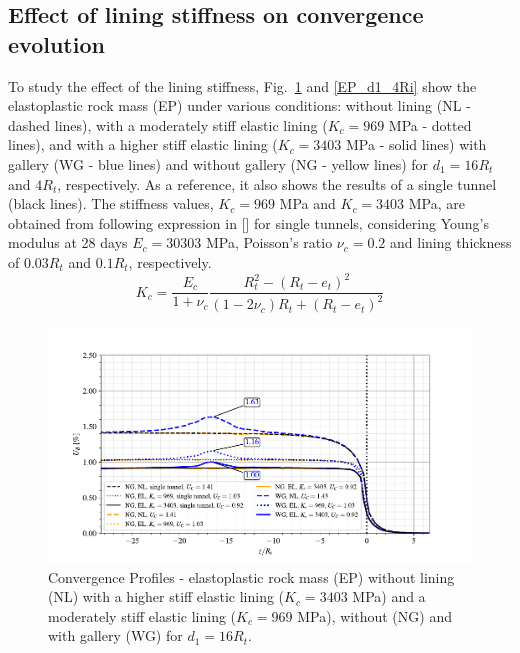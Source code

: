 \documentclass[a4paper,fleqn]{cas-sc}
\begin{document}
\subsection{Effect of lining stiffness on convergence evolution}\label{}

To study the effect of the lining stiffness, Fig.~\ref{EP_d1_16Ri} and \ref{EP_d1_4Ri} show the elastoplastic rock mass (EP) under various conditions: without lining (NL - dashed lines), with a moderately stiff elastic lining ($K_c = 969$ MPa - dotted lines), and with a higher stiff elastic lining ($K_c = 3403$ MPa - solid lines) with gallery (WG - blue lines) and without gallery (NG - yellow lines) for $d_1 = 16R_t$ and $4R_t$, respectively. As a reference, it also shows the results of a single tunnel (black lines). The stiffness values, $K_c = 969$ MPa and $K_c = 3403$ MPa, are obtained from following expression in [] for single tunnels, considering Young's modulus at 28 days $E_c = 30303$ MPa, Poisson's ratio $\nu_c = 0.2$ and lining thickness of $0.03R_t$ and $0.1R_t$, respectively.
\begin{equation} \label{eq:8}
	K_c = \frac{E_c}{1+\nu_c}\frac{R_t^2-(R_t-e_t)^2}{(1-2\nu_c)R_t+(R_t-e_t)^2}
\end{equation}
\begin{figure}[h!]
	\centering
	\includegraphics[scale=0.9]{Convergence Profiles - EP_d1_16Ri_anotate.pdf}
	\caption{Convergence Profiles - elastoplastic rock mass (EP) without lining (NL) with a higher stiff elastic lining ($K_c = 3403$ MPa) and a moderately stiff elastic lining ($K_c = 969$ MPa), without (NG) and with gallery (WG) for $d_1 = 16R_t$.}
	\label{EP_d1_16Ri}
\end{figure}
\FloatBarrier
\end{document}
